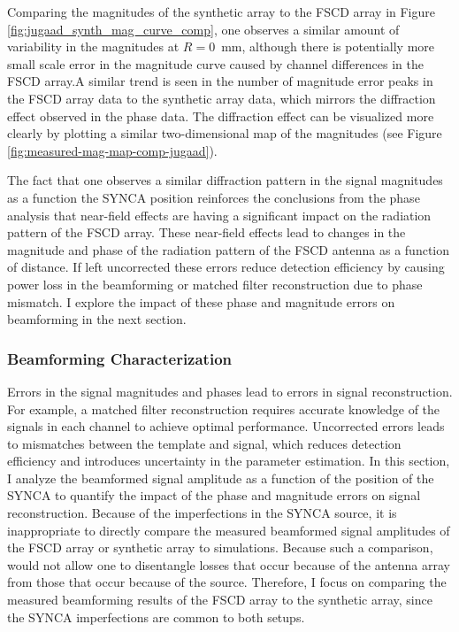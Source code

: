 Comparing the magnitudes of the synthetic array to the FSCD array in Figure \ref{fig:jugaad_synth_mag_curve_comp}, one observes a similar amount of variability in the magnitudes at $R=0$~mm, although there is potentially more small scale error in the magnitude curve caused by channel differences in the FSCD array.A similar trend is seen in the number of magnitude error peaks in the FSCD array data to the synthetic array data, which mirrors the diffraction effect observed in the phase data. The diffraction effect can be visualized more clearly by plotting a similar two-dimensional map of the magnitudes (see Figure \ref{fig:measured-mag-map-comp-jugaad}).

The fact that one observes a similar diffraction pattern in the signal magnitudes as a function the SYNCA position reinforces the conclusions from the phase analysis that near-field effects are having a significant impact on the radiation pattern of the FSCD array. These near-field effects lead to changes in the magnitude and phase of the radiation pattern of the FSCD antenna as a function of distance. If left uncorrected these errors reduce detection efficiency by causing power loss in the beamforming or matched filter reconstruction due to phase mismatch. I explore the impact of these phase and magnitude errors on beamforming in the next section.

\subsubsection{Beamforming Characterization}
\label{sec:jugaad_bf_analysis}

Errors in the signal magnitudes and phases lead to errors in signal reconstruction. For example, a matched filter reconstruction requires accurate knowledge of the signals in each channel to achieve optimal performance. Uncorrected errors leads to mismatches between the template and signal, which reduces detection efficiency and introduces uncertainty in the parameter estimation. In this section, I analyze the beamformed signal amplitude as a function of the position of the SYNCA to quantify the impact of the phase and magnitude errors on signal reconstruction. Because of the imperfections in the SYNCA source, it is inappropriate to directly compare the measured beamformed signal amplitudes of the FSCD array or synthetic array to simulations. Because such a comparison, would not allow one to disentangle losses that occur because of the antenna array from those that occur because of the source. Therefore, I focus on comparing the measured beamforming results of the FSCD array to the synthetic array, since the SYNCA imperfections are common to both setups.

